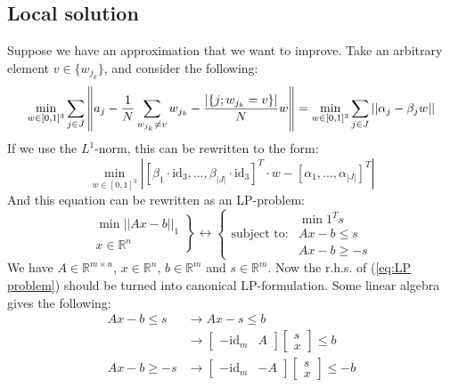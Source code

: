 \documentclass[10pt,a4paper]{article}
\newcommand{\R}{\mathbb{R}}
\newcommand{\id}{\text{id}}
\begin{document}
	\subsection*{Local solution}
	Suppose we have an approximation that we want to improve.
	Take an arbitrary element $v \in \{ w_{j_k} \}$, and consider the following:
	\begin{equation*}
	\min_{w \in [0,1]^3} \sum_{j \in J} \left\lVert a_j - {1 \over N} \sum_{w_{j_k} \neq v} w_{j_k} - {|\{j; w_{j_k} = v\}| \over N} w \right\rVert = \min_{w \in [0,1]^3} \sum_{j \in J} ||\alpha_j - \beta_j w||
	\end{equation*}
	If we use the $L^1$-norm, this can be rewritten to the form:
	\begin{equation*}
	\min_{w \in [0,1]^3} |[\beta_1 \cdot \id_{3}, ..., \beta_{|J|} \cdot \id_{3}]^T \cdot w - [\alpha_1, ..., \alpha_{|J|}]^T|
	\end{equation*}
	And this equation can be rewritten as an LP-problem:
	\begin{equation}
	\left. \begin{matrix}
	\min ||Ax - b||_1\\
	x \in \R^n
	\end{matrix} \right\} 
	\longleftrightarrow 
	\left\{ \begin{matrix}
	&\min 1^T s\\
	\text{subject to:}& Ax - b \leq s\\
	&Ax-b \geq -s
	\end{matrix}\right.
	\label{eq:LP problem}
	\end{equation}
	We have $A \in \R^{m\times n}$, $x \in \R^n$, $b \in \R^m$ and $s \in \R^m$. 
	Now the r.h.s. of (\ref{eq:LP problem}) should be turned into canonical LP-formulation.
	Some linear algebra gives the following:
	\begin{align*}
	Ax - b \leq s &\longrightarrow Ax - s \leq b \\
	&\longrightarrow \begin{bmatrix}-\id_{m} & A\end{bmatrix} \begin{bmatrix}s\\ x\end{bmatrix} \leq b\\
	Ax - b \geq -s &\longrightarrow \begin{bmatrix}-\id_{m} & -A\end{bmatrix} \begin{bmatrix}s\\ x\end{bmatrix} \leq -b
	\end{align*}
\end{document}

